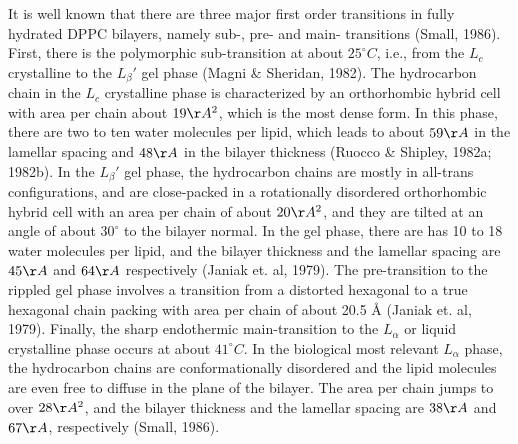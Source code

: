 It is well known that there are three major first order transitions 
in fully hydrated DPPC bilayers,
namely sub-, pre- and main- transitions (Small, 1986).
First, there is the polymorphic sub-transition at about $25^\circ C$, 
i.e., from the $L_c$ crystalline to the $L_\beta'$ 
gel phase (Magni \& Sheridan, 1982).
The hydrocarbon chain in the $L_c$ crystalline phase is characterized
by an orthorhombic hybrid cell with area per chain about $19\AA^2$, 
which is the most dense form. In
this phase, there are two to ten water molecules per lipid, which
leads to about $59\AA$ in the lamellar spacing and $48\AA$ in the  
bilayer thickness (Ruocco \& Shipley, 1982a; 1982b).
In the $L_\beta'$ gel phase,
the hydrocarbon chains are mostly in all-trans configurations, and
are close-packed in a rotationally disordered orthorhombic hybrid
cell with an area per chain of about $20\AA^2$, and they are tilted 
at an angle of about $30^\circ$ to the bilayer normal. 
In the gel phase, there are  has 10 to 18 water molecules
per lipid, and the bilayer thickness and the lamellar spacing are
$45\AA$ and $64\AA$ respectively (Janiak et. al, 1979).
The pre-transition to the rippled gel phase involves
a transition from a distorted hexagonal to a true hexagonal 
chain packing with area per chain of about 20.5 \AA
(Janiak et. al, 1979).
Finally, the sharp endothermic main-transition 
to the $L_\alpha$ or liquid crystalline phase occurs at about $41^\circ
C$. In the biological most
relevant $L_\alpha$ phase, the hydrocarbon chains are
conformationally disordered and the lipid molecules are even free to
diffuse in the plane of the bilayer. The area per chain jumps to
over $28\AA^2$, and the bilayer thickness and the lamellar spacing
are $38\AA$ and $67\AA$, respectively (Small, 1986).

